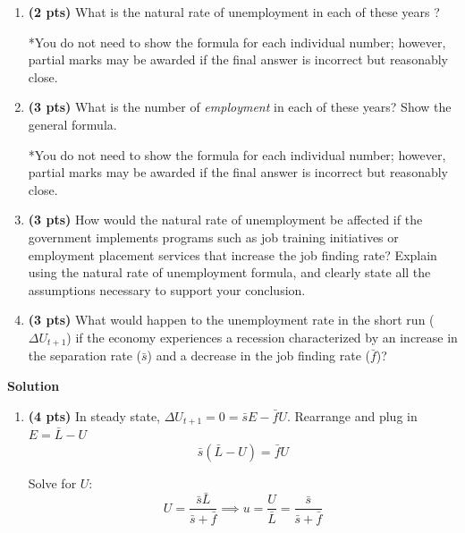 \documentclass[14pt, oneside]{memoir}
\begin{document}
\begin{enumerate}[label=\textbf{\arabic*.}, itemsep=15pt]
\begin{enumerate}[label=(\alph*)]
	\item \textbf{(2 pts)} What is the natural rate of unemployment in each of these years ? 
	
	*You do not need to show the formula for each individual number; however, partial marks may be awarded if the final answer is incorrect but reasonably close.

	\item \textbf{(3 pts)} What is the number of \textit{employment} in each of these years? Show the general formula.
	
	*You do not need to show the formula for each individual number; however, partial marks may be awarded if the final answer is incorrect but reasonably close.
	
	
	\item \textbf{(3 pts)} How would the natural rate of unemployment be affected if the government implements programs such as job training initiatives or employment placement services that increase the job finding rate? Explain using the natural rate of unemployment formula, and clearly state all the assumptions necessary to support your conclusion.
	\vspace{10cm}
	
	\item \textbf{(3 pts)} What would happen to the unemployment rate in the short run (\( \Delta U_{t+1} \)) if the economy experiences a recession characterized by an increase in the separation rate (\( \bar{s} \)) and a decrease in the job finding rate (\( \bar{f} \))?
	
\end{enumerate}

\clearpage
\textbf{Solution}
\begin{enumerate}[label=(\alph*)]
	\item \textbf{(4 pts)} 	
		In steady state, $\Delta U_{t+1} = 0 = \bar{s} E - \bar{f} U$. Rearrange and plug in $E = \bar{L}-U$
		\[\bar{s} (\bar{L}-U) = \bar{f} U\]
		
		Solve for $U$:
		\[U = \frac{\bar{s}\bar{L}}{\bar{s}+\bar{f}} \implies u = \frac{U}{\bar{L}} = \frac{\bar{s}}{\bar{s}+\bar{f}} \]


\end{enumerate}
\end{enumerate}
\end{document}
